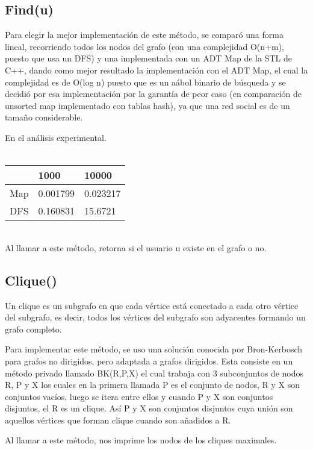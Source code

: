 \documentclass[12pt]{article}
\begin{document}
\subsection{Find(u)}

\indent \indent Para elegir la mejor implementación de este método, se comparó una forma lineal, recorriendo todos los nodos del grafo (con una complejidad O(n+m), puesto que usa un DFS) y una implementada con un ADT Map de la STL de C++, dando como mejor resultado la implementación con el ADT Map, el cual la complejidad es de O(log n) puesto que es un aábol binario de búsqueda y se decidió por esa implementación por la garantía de peor caso (en comparación de unsorted map implementado con tablas hash), ya que una red social es de un tamaño considerable.

En el análisis experimental.\\
\\
\begin{tabular}{l|l|l|}
\cline{2-3}
                          & 1000     & 10000    \\ \hline
\multicolumn{1}{|l|}{Map} & 0.001799 & 0.023217 \\ \hline
\multicolumn{1}{|l|}{DFS} & 0.160831 & 15.6721  \\ \hline
\end{tabular}
\\

Al llamar a este método, retorna si el usuario u existe en el grafo o no.

\subsection{Clique()}

\indent\indent Un clique es un subgrafo en que cada vértice está conectado a cada otro vértice del subgrafo, es decir, todos los vértices del subgrafo son adyacentes formando un grafo completo.

Para implementar este método, se uso una solución conocida por Bron-Kerbosch para grafos no dirigidos, pero adaptada a grafos dirigidos. Esta consiste en un método privado llamado BK(R,P,X) el cual trabaja con 3 subconjuntos de nodos R, P y X los cuales en la primera llamada P es el conjunto de nodos, R y X son conjuntos vacíos, luego se itera entre ellos y cuando P y X son conjuntos disjuntos, el R es un clique. Así P y X son conjuntos disjuntos cuya unión son aquellos vértices que forman clique cuando son añadidos a R.

Al llamar a este método, nos imprime los nodos de los cliques maximales. 
\end{document}
